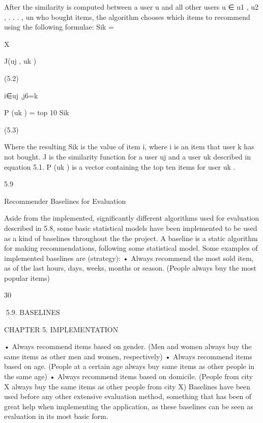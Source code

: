 After the similarity is computed between a user u and all other users u ∈ {u1 , u2 , . . . , un }
who bought items, the algorithm chooses which items to recommend using the following
formulae:
Sik =

X

J(uj , uk )

(5.2)

i∈uj ,j6=k

P (uk ) = top 10 Sik

(5.3)

Where the resulting Sik is the value of item i, where i is an item that user k has not
bought. J is the similarity function for a user uj and a user uk described in equation
5.1. P (uk ) is a vector containing the top ten items for user uk .

5.9

Recommender Baselines for Evaluation

Aside from the implemented, significantly different algorithms used for evaluation described in 5.8, some basic statistical models have been implemented to be used as a
kind of baselines throughout the the project. A baseline is a static algorithm for making recommendations, following some statistical model. Some examples of implemented
baselines are (strategy):
• Always recommend the most sold item, as of the last hours, days, weeks, months
or season. (People always buy the most popular items)

30

5.9. BASELINES

CHAPTER 5. IMPLEMENTATION

• Always recommend items based on gender. (Men and women always buy the same
items as other men and women, respectively)
• Always recommend items based on age. (People at a certain age always buy same
items as other people in the same age)
• Always recommend items based on domicile. (People from city X always buy the
same items as other people from city X)
Baselines have been used before any other extensive evaluation method, something that
has been of great help when implementing the application, as these baselines can be seen
as evaluation in its most basic form.

